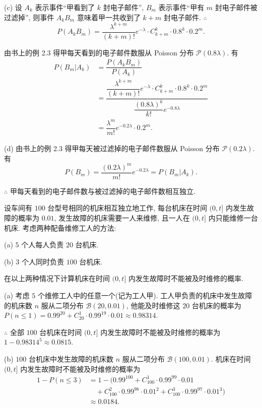 \documentclass[color=black,device=normal,lang=cn]{elegantnote}
\numberwithin{equation}{section}
\theoremstyle{plain}
\numberwithin{exercise}{exsection}
\begin{document}
\begin{solution}
    (c) 设 $A_k$ 表示事件``甲看到了 $k$ 封电子邮件'',  $B_m$ 表示事件``甲有 $m$ 封电子邮件被过滤掉'', 则事件 $A_kB_m$ 意味着甲一共收到了 $k+m$ 封电子邮件. $\therefore$
    \[P(A_kB_m)=\dfrac{\lambda^{k+m}}{(k+m)!}e^{-\lambda}\cdot C_{k+m}^k\cdot0.8^k\cdot0.2^m.\]

    由书上的例 2.3 得甲每天看到的电子邮件数服从 Poisson 分布 $\mathcal{P}(0.8\lambda)$. 有
    \begin{align*}
        P(B_m|A_k) & =\dfrac{P(A_kB_m)}{P(A_k)} \\
        & =\dfrac{\dfrac{\lambda^{k+m}}{(k+m)!}e^{-\lambda}\cdot C_{k+m}^k\cdot0.8^k\cdot0.2^m}{\dfrac{(0.8\lambda)^k}{k!}e^{-0.8\lambda}} \\
        & =\dfrac{\lambda^m}{m!}e^{-0.2\lambda}\cdot0.2^m.
    \end{align*}

    (d) 由书上的例 2.3 得甲每天被过滤掉的电子邮件数服从 Poisson 分布 $\mathcal{P}(0.2\lambda)$. 有
    \[P(B_m)=\dfrac{(0.2\lambda)^m}{m!}e^{-0.2\lambda}=P(B_m|A_k).\]

    $\therefore$ 甲每天看到的电子邮件数与被过滤掉的电子邮件数相互独立.
\end{solution}
\begin{exercise}%
    设车间有 $100$ 台型号相同的机床相互独立地工作, 每台机床在时间 $(0,t]$ 内发生故障的概率为 $0.01$, 发生故障的机床需要一人来维修, 且一人在 $(0,t]$ 内只能维修一台机床. 考虑两种配备维修工人的方法:

    (a) $5$ 个人每人负责 $20$ 台机床.
    
    (b) $3$ 个人同时负责 $100$ 台机床.

    在以上两种情况下计算机床在时间 $(0,t]$ 内发生故障时不能被及时维修的概率.
\end{exercise}
\begin{solution}
    (a) 考虑 $5$ 个维修工人中的任意一个(记为工人甲). 工人甲负责的机床中发生故障的机床数 $n$ 服从二项分布 $\mathcal{B}(20,0.01)$, 他能及时维修这 $20$ 台机床的概率为 $P(n\leq1)=0.99^{20}+C_{20}^1\cdot0.99^{19}\cdot0.01\approx0.98314$.

    $\therefore$ 全部 $100$ 台机床在时间 $(0,t]$ 内发生故障时不能被及时维修的概率为 $1-0.98314^5\approx0.0815$.

    (b) $100$ 台机床中发生故障的机床数 $n$ 服从二项分布 $\mathcal{B}(100,0.01)$. 机床在时间 $(0,t]$ 内发生故障时不能被及时维修的概率为
    \begin{align*}
        1-P(n\leq 3) & =1-(0.99^{100}+C_{100}^1\cdot0.99^{99}\cdot0.01 \\
        & \quad+C_{100}^2\cdot0.99^{98}\cdot0.01^2+C_{100}^3\cdot0.99^{97}\cdot0.01^3) \\
        & \approx0.0184.
    \end{align*}
\end{solution}
\end{document}
